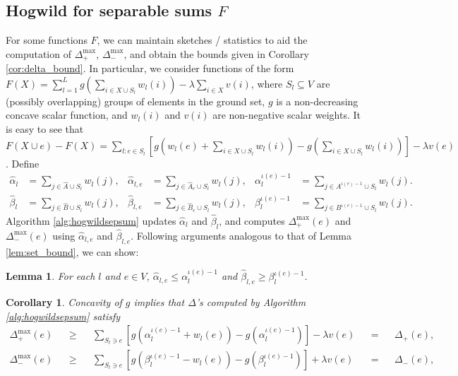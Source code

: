 \documentclass{article} %
\newtheorem{cor}[thm]{Corollary}
\newtheorem{lem}[thm]{Lemma}
\begin{document}
\subsection{Hogwild for separable sums $F$}
For some functions $F$, we can maintain sketches / statistics to aid the computation of $\Delta_+^{\max}$, $\Delta_-^{\max}$, and obtain the bounds given in Corollary \ref{cor:delta_bound}.
In particular, we consider functions of the form
$
F(X) = \sum_{l=1}^L g\left(\sum_{i\in X\cup S_l} w_l(i)\right) - \lambda\sum_{i\in X} v(i)$,
where $S_l \subseteq V$ are (possibly overlapping) groups of elements in the ground set, $g$ is a non-decreasing concave scalar function, and $w_l(i)$ and $v(i)$ are non-negative scalar weights.
It is easy to see that
$
F(X \cup e) - F(X) = \sum_{l: e\in S_l} \left[g\left(w_l(e) + \sum_{i\in X\cup S_l} w_l(i)\right) - g\left(\sum_{i\in X\cup S_l} w_l(i)\right)\right] - \lambda v(e)$.
Define
% 
%
\begin{align*}
  \hat\alpha_l              &= \sum_{j\in \hat{A}\cup S_l} w_l(j),
& \hat\alpha_{l,e}          &= \sum_{j\in \hat{A}_e\cup S_l} w_l(j),
& \alpha_l^{\iota(e)-1} &= \sum_{j\in A^{\iota(e)-1}\cup S_l} w_l(j).\\
  \hat\beta_l              &= \sum_{j\in \hat{B}\cup S_l} w_l(j),
& \hat\beta_{l,e}          &= \sum_{j\in \hat{B}_e\cup S_l} w_l(j),
& \beta_l^{\iota(e)-1} &= \sum_{j\in B^{\iota(e)-1}\cup S_l} w_l(j).
\end{align*}
Algorithm \ref{alg:hogwildsepsum} updates $\hat\alpha_l$ and $\hat\beta_l$, and computes $\Delta_+^{\max}(e)$ and $\Delta_-^{\max}(e)$ using $\hat\alpha_{l,e}$ and $\hat\beta_{l,e}$.
Following arguments analogous to that of Lemma \ref{lem:set_bound}, we can show:

\begin{lem} For each $l$ and $e\in V$, $\hat\alpha_{l,e} \leq \alpha_l^{\iota(e)-1}$ and $\hat\beta_{l,e} \geq \beta_l^{\iota(e)-1}$.
\end{lem}

\begin{cor} Concavity of $g$ implies that $\Delta$'s computed by Algorithm \ref{alg:hogwildsepsum} satisfy
\begin{align*}
\Delta_+^{\max}(e)
&&\geq&& \sum_{S_l\ni e} \left[g(\alpha_l^{\iota(e)-1} + w_l(e)) - g(\alpha_l^{\iota(e)-1})\right] - \lambda v(e)
&&=&& \Delta_+(e),\\
\Delta_-^{\max}(e)
&&\geq&& \sum_{S_l\ni e} \left[g(\beta_l^{\iota(e)-1} - w_l(e)) - g(\beta_l^{\iota(e)-1})\right] + \lambda v(e)
&&=&& \Delta_-(e),
\end{align*}
\end{cor}
\end{document}
